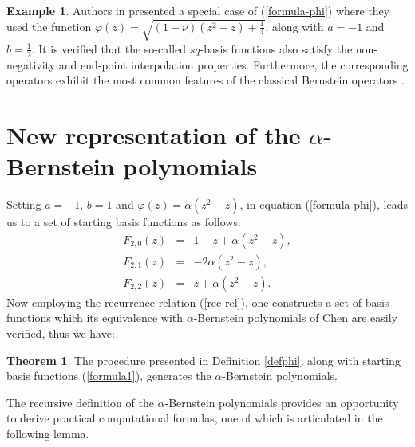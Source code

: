 \documentclass[preprint,12pt]{elsarticle}
\theoremstyle{definition}
\theoremstyle{theorem}
\newtheorem{theorem}{Theorem}
\theoremstyle{lemma}
\theoremstyle{example}
\newtheorem{example}{Example}
\theoremstyle{remark}
\theoremstyle{prop}
\begin{document}
\begin{example}
Authors in \cite{nouri2022class} presented a special case of (\ref{formula-phi}) where they used the  function $\varphi (z)=\sqrt{\left ( 1-\nu  \right )\left ( z^{2}-z \right )+\frac{1}{4}}$, along with $a=-1$ and $b=\frac{1}{2}$. 
It is verified that the so-called $sq$-basis functions also satisfy the non-negativity and end-point interpolation properties. Furthermore, the corresponding operators exhibit the most common features of the classical Bernstein operators \cite{nouri2023family}.
\end{example}





\section{New representation of the $\alpha$-Bernstein polynomials}

Setting $a=-1$, $b=1$  and $\varphi(z)=\alpha (z^2-z)$, in equation (\ref{formula-phi}), leads us to a set of starting basis functions as follows:
\begin{eqnarray} 
F_{2,0}(z)&=&1-z+\alpha \left ( z^{2}-z \right ),\nonumber \\
F_{2,1}(z)&=&-2\alpha \left ( z^{2}-z \right ), \label{formula1}\\
F_{2,2}(z)&=&z+\alpha \left ( z^{2}-z \right ).\nonumber
\end{eqnarray} 
Now employing the recurrence relation (\ref{rec-rel}), one constructs a set of basis functions which its equivalence with $\alpha$-Bernstein polynomials of Chen \cite{chen2017approximation} are easily verified, thus we have:
\begin{theorem}

The procedure presented in Definition \ref{defphi}, along with starting basis functions (\ref{formula1}), generates the $\alpha$-Bernstein polynomials.
\end{theorem}



The recursive definition of the $\alpha$-Bernstein polynomials provides an opportunity to derive practical computational formulas, one of which is articulated in the following lemma.
\end{document}
